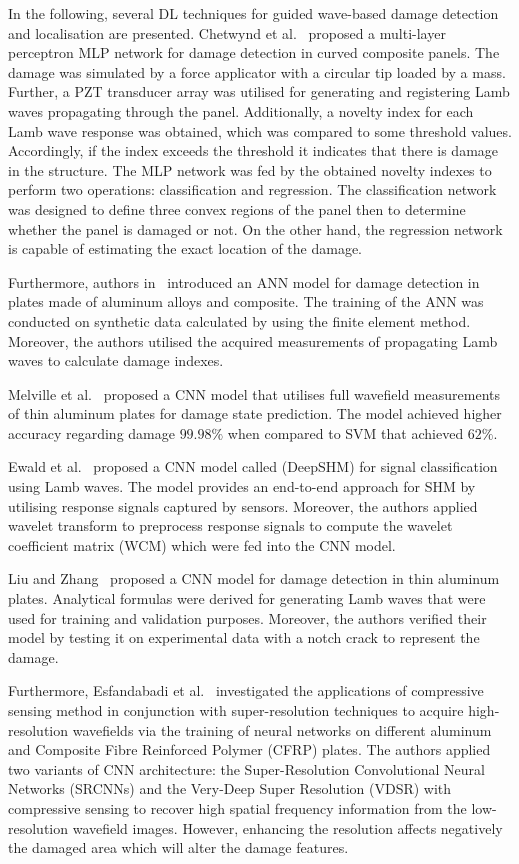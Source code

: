 In the following, several DL techniques for guided wave-based damage detection and localisation are presented.
Chetwynd et al.~\cite{Chetwynd2008} proposed a multi-layer perceptron MLP network for damage detection in curved composite panels.
The damage was simulated by a force applicator with a circular tip loaded by a mass.
Further, a PZT transducer array was utilised for generating and registering Lamb waves propagating through the panel.
Additionally, a novelty index for each Lamb wave response was obtained,
which was compared to some threshold values. 
Accordingly, if the index exceeds the threshold it indicates that there is damage in the structure. 
The MLP network was fed by the obtained novelty indexes to perform two operations: classification and regression. 
The classification network was designed to define three convex regions of the panel then to determine whether the panel is damaged or not. 
On the other hand, the regression network is capable of estimating the exact location of the damage.

Furthermore, authors in~\cite{DeFenza2015} introduced an ANN model for damage detection in plates made of aluminum alloys and composite.
The training of the ANN was conducted on synthetic data calculated by using the finite element method.
Moreover, the authors utilised the acquired measurements of propagating Lamb waves to calculate damage indexes.

Melville et al.~\cite{Melville2018} proposed a CNN model that utilises full wavefield measurements of thin aluminum plates for damage state prediction.
The model achieved higher accuracy regarding damage \(99.98\%\) when compared to SVM that achieved \(62\%\).

Ewald et al.~\cite{Ewald2019} proposed a CNN model called (DeepSHM) for signal classification using Lamb waves.
The model provides an end-to-end approach for SHM by utilising response signals captured by sensors.
Moreover, the authors applied wavelet transform to preprocess response signals to compute the wavelet coefficient matrix (WCM) which were fed into the CNN model.

Liu and Zhang~\cite{Liu2020a} proposed a CNN model for damage detection in thin aluminum plates.
Analytical formulas were derived for generating Lamb waves that were used for training and validation purposes.
Moreover, the authors verified their model by testing it on experimental data with a notch crack to represent the damage.

Furthermore, Esfandabadi et al.~\cite{esfandabadideep} investigated the applications of compressive sensing method in conjunction with super-resolution techniques to acquire high-resolution wavefields via the training of neural networks on different aluminum and Composite Fibre Reinforced Polymer (CFRP) plates. 
The authors applied two variants of CNN architecture:  the Super-Resolution Convolutional Neural Networks (SRCNNs) and the Very-Deep Super Resolution (VDSR) with compressive sensing to recover high spatial frequency information from the low-resolution wavefield images.
However, enhancing the resolution affects negatively the damaged area which will alter the damage features.

